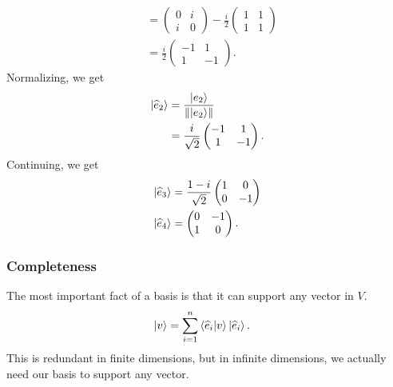 \documentclass[10pt]{mypackage}
\begin{document}
\begin{example}
\begin{align*}
            &= \begin{pmatrix}0 & i \\ i & 0\end{pmatrix} - \frac{i}{2} \begin{pmatrix}1 & 1 \\ 1 & 1\end{pmatrix}\\
            &= \frac{i}{2} \begin{pmatrix}-1 & 1 \\ 1 & -1\end{pmatrix}.
\end{align*}
Normalizing, we get
\begin{align*}
  \ket{\widehat{e}_2} &= \frac{\ket{e_2}}{\norm{\ket{e_2}}}\\
                  &= \frac{i}{\sqrt{2}} \begin{pmatrix}-1 & 1 \\ 1 & -1\end{pmatrix}.
\end{align*}
Continuing, we get
\begin{align*}
  \ket{\widehat{e}_3} &= \frac{1-i}{\sqrt{2}} \begin{pmatrix}1 & 0 \\ 0 & -1\end{pmatrix}\\
  \ket{\widehat{e}_4} &= \begin{pmatrix}0 & -1 \\ 1 & 0\end{pmatrix}.
\end{align*}

\end{example}
\subsubsection{Completeness}%
The most important fact of a basis is that it can support any vector in $V$.
\begin{align*}
  \ket{v} &= \sum_{i=1}^{n}\braket{\widehat{e}_i}{v}\ket{\widehat{e}_i}.
\end{align*}
This is redundant in finite dimensions, but in infinite dimensions, we actually need our basis to support any vector.\newline
\end{document}

